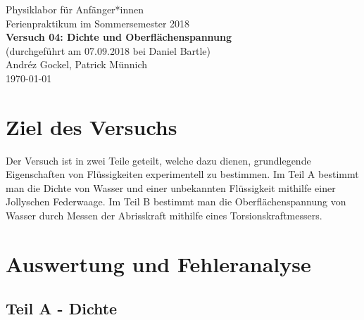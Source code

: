 \documentclass[11pt,a4paper]{article}
\begin{document}
{
\centering 
\large 
Physiklabor für Anf\"anger*innen \\
Ferienpraktikum im Sommersemester 2018 \\[4mm]
\textbf{\LARGE 
Versuch 04: Dichte und Oberflächenspannung
} \\[3mm]
(durchgef\"uhrt am 07.09.2018 bei Daniel Bartle) \\
Andréz Gockel, Patrick M\"unnich\\
\today \\[10mm]
}

\section{Ziel des Versuchs}

Der Versuch ist in zwei Teile geteilt, welche dazu dienen, grundlegende Eigenschaften von Fl\"ussigkeiten experimentell zu bestimmen. Im Teil A bestimmt man die Dichte von Wasser und einer unbekannten Fl\"ussigkeit mithilfe einer Jollyschen Federwaage. Im Teil B bestimmt man die Oberfl\"achen\-spannung von Wasser durch Messen der Abrisskraft mithilfe eines Torsionskraftmessers.

\section{Auswertung und Fehleranalyse}


\subsection{Teil A - Dichte}
\end{document}
